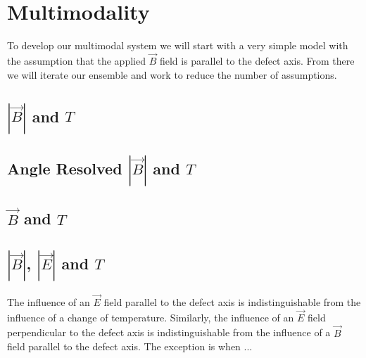 \section{Multimodality}
To develop our multimodal system we will start with a very simple model with the assumption that the applied $\vec{B}$ field is parallel to the defect axis. From there we will iterate our ensemble and work to reduce the number of assumptions.  


\subsection{$|\vec{B}|$ and $T$}
\cite{Degen2008}
\lipsum[1-4]

\subsection{Angle Resolved $|\vec{B}|$ and $T$}
\cite{PhysRevApplied.4.014009}
\lipsum[1-4]

\subsection{$\vec{B}$ and $T$}
\lipsum[1-4]


\subsection{$|\vec{B}|$, $|\vec{E}|$ and $T$}
The influence of an $\vec{E}$ field parallel to the defect axis is indistinguishable from the influence of a change of temperature. Similarly, the influence of an $\vec{E}$ field perpendicular to the defect axis is indistinguishable from the influence of a $\vec{B}$ field parallel to the defect axis. The exception is when ... 

\begin{figure}[h]
    \begin{center}
    \end{center}
    \caption{}\label{fig:}
\end{figure}


